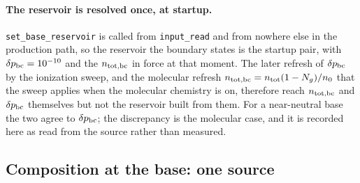 \documentclass[english,a4paper]{my_memo}
\begin{document}
\paragraph{The reservoir is resolved once, at startup.}
\texttt{set\_base\_reservoir} is called from \texttt{input\_read} and from
nowhere else in the production path, so the reservoir the boundary states is
the startup pair, with $\delta p_{\rm bc} = 10^{-10}$ and the
$n_{\rm tot,bc}$ in force at that moment. The later refresh of
$\delta p_{\rm bc}$ by the ionization sweep, and the molecular refresh
$n_{\rm tot,bc} = n_{\rm tot}(1-N_g)/n_0$ that the sweep applies when the
molecular chemistry is on, therefore reach $n_{\rm tot,bc}$ and
$\delta p_{\rm bc}$ themselves but not the reservoir built from them. For a
near-neutral base the two agree to $\delta p_{\rm bc}$; the discrepancy is
the molecular case, and it is recorded here as read from the source rather
than measured.

\subsection{Composition at the base: one source}
\label{sec:basecomp}
\end{document}
